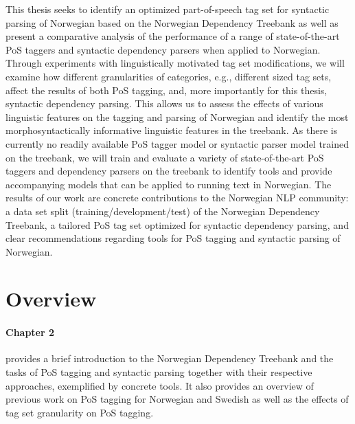 \documentclass[a4paper,12pt,english]{book}
\begin{document}
This thesis seeks to identify an optimized part-of-speech tag set for syntactic
parsing of Norwegian based on the Norwegian Dependency Treebank as well as
present a comparative analysis of the performance of a range of
state-of-the-art PoS taggers and syntactic dependency parsers when applied to
Norwegian. Through experiments with linguistically motivated tag set
modifications, we will examine how different granularities of categories, e.g.,
different sized tag sets, affect the results of both PoS tagging, and, more
importantly for this thesis, syntactic dependency parsing. This allows us to
assess the effects of various linguistic features on the tagging and parsing of
Norwegian and identify the most morphosyntactically informative linguistic
features in the treebank. As there is currently no readily available PoS tagger
model or syntactic parser model trained on the treebank, we will train and
evaluate a variety of state-of-the-art PoS taggers and dependency parsers on
the treebank to identify tools and provide accompanying models that can be
applied to running text in Norwegian.
The results of our work are concrete contributions to the Norwegian NLP
community: a data set split (training/development/test) of the Norwegian
Dependency Treebank, a tailored PoS tag set optimized for syntactic dependency
parsing, and clear recommendations regarding tools for PoS tagging and syntactic
parsing of Norwegian.



\section{Overview}
\paragraph{Chapter 2} provides a brief introduction to the Norwegian Dependency
Treebank and the tasks of PoS tagging and syntactic parsing together with their
respective approaches, exemplified by concrete tools.  It also provides an
overview of previous work on PoS tagging for Norwegian and Swedish as well as
the effects of tag set granularity on PoS tagging.
\end{document}
